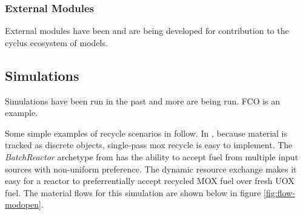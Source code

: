 \subsubsection{External Modules}
External modules have been 
\cite{cyder,separations,streamblender,mktdriveninst,commodconverter} and are 
being \cite{britelite,utk} developed for contribution to the cyclus ecosystem 
of models. 



\subsection{Simulations}


Simulations have been run in the past and more are being run. FCO is an 
example. 

Some simple examples of recycle scenarios in \Cyclus follow.  In \Cyclus,
because material is tracked as discrete objects, single-pass mox recycle is
easy to implement.  The \textit{BatchReactor} archetype from \Cycamore has the
ability to accept fuel from multiple input sources with non-uniform
preference.  The dynamic resource exchange makes it easy for a reactor to
preferrentially accept recycled MOX fuel over fresh UOX fuel.  The material
flows for this simulation are shown below in figure \ref{fig:flow-modopen}.

